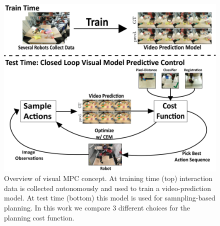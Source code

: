 
\begin{figure}[t]
\centering
\includegraphics[width=\columnwidth,trim={0mm 0 0 0},clip]{images_general/overview_roughdraft.png}
\caption{\small{Overview of visual MPC concept. At training time (top) interaction data is collected autonomously and used to train a video-prediction model. At test time (bottom) this model is used for samnpling-based planning. In this work we compare 3 different choices for the planning cost function.}}
\label{fig:overview}
\end{figure}


